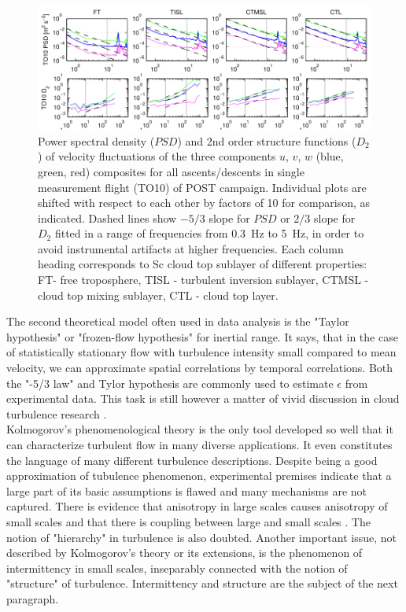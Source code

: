 \documentclass[../main.tex]{subfiles}
\begin{document}
\begin{figure}
\centering
\noindent \includegraphics[width=30pc]{gfx/POST_spectra_struct.png}
\caption{Power spectral density ($PSD$) and 2nd order structure functions ($D_2$) of velocity fluctuations of the three components $u$, $v$, $w$ (blue, green, red) composites for all ascents/descents in single measurement flight (TO10) of POST campaign. Individual plots are shifted with respect to each other by factors of 10 for comparison, as indicated. Dashed lines show $-5/3$ slope for $PSD$ or $2/3$ slope for $D_2$ fitted in a range of frequencies from 0.3~Hz to 5~Hz, in order to avoid instrumental artifacts at higher frequencies. Each column heading corresponds to Sc cloud top sublayer of different properties: FT- free troposphere, TISL - turbulent inversion sublayer, CTMSL - cloud top mixing sublayer, CTL - cloud top layer.}
\label{fig:ch1_02}
\end{figure}
The second theoretical model often used in data analysis is the "Taylor hypothesis" or "frozen-flow hypothesis" for inertial range. It says, that in the case of statistically stationary flow with turbulence intensity small compared to mean velocity, we can approximate spatial correlations by temporal correlations. Both the "-5/3 law" and Tylor hypothesis are commonly used to estimate $\epsilon$ from experimental data. This task is still however a matter of vivid discussion in cloud turbulence research \citep{Waclawczyk2017, Zilitinkevich2019}.\\
Kolmogorov's phenomenological theory is the only tool  developed so well that it can characterize turbulent flow in many diverse applications. It even constitutes the language of many different turbulence descriptions. Despite being a good approximation of tubulence phenomenon, experimental premises indicate that a large part of its basic assumptions is flawed and many mechanisms are not captured. There is evidence that anisotropy in large scales causes anisotropy of small scales and that there is coupling between large and small scales \citep{Warhaft2000}. The notion of "hierarchy" in turbulence is also doubted. Another important issue, not described by Kolmogorov's theory or its extensions, is the phenomenon of intermittency in small scales, inseparably connected with the notion of "structure" of turbulence. Intermittency and structure are the subject of the next paragraph.
\end{document}
